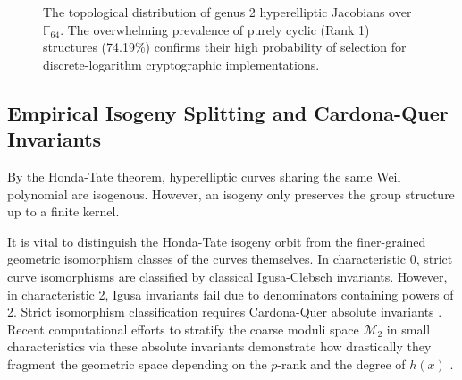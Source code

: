 \documentclass[letterpaper, 11pt]{article}
\begin{document}
\begin{figure}[htpb]
    \centering
    \caption{The topological distribution of genus 2 hyperelliptic Jacobians over $\mathbb{F}_{64}$. The overwhelming prevalence of purely cyclic (Rank 1) structures (74.19\%) confirms their high probability of selection for discrete-logarithm cryptographic implementations.}
    \label{fig:rank_distribution}
\end{figure}

\subsection{Empirical Isogeny Splitting and Cardona-Quer Invariants}
By the Honda-Tate theorem, hyperelliptic curves sharing the same Weil polynomial are isogenous. However, an isogeny only preserves the group structure up to a finite kernel. 

It is vital to distinguish the Honda-Tate isogeny orbit from the finer-grained geometric isomorphism classes of the curves themselves. In characteristic 0, strict curve isomorphisms are classified by classical Igusa-Clebsch invariants. However, in characteristic 2, Igusa invariants fail due to denominators containing powers of 2. Strict isomorphism classification requires Cardona-Quer absolute invariants \cite{Cardona2005}. Recent computational efforts to stratify the coarse moduli space $\mathcal{M}_2$ in small characteristics via these absolute invariants demonstrate how drastically they fragment the geometric space depending on the $p$-rank and the degree of $h(x)$ \cite{Zobernig2021}.
\end{document}
